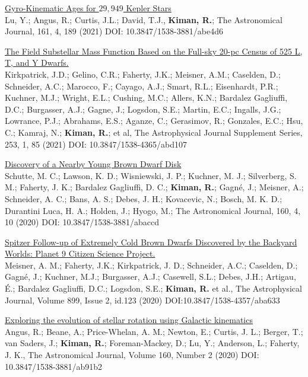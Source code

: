 \documentclass[10pt]{cv}
\begin{document}
\begin{llist}
\begin{etaremune}
  \item \href{https://ui.adsabs.harvard.edu/abs/2021arXiv210201772Y/abstract}{Gyro-Kinematic Ages for $29,949$ Kepler Stars}\\ Lu, Y.; Angus, R.; Curtis, J.L.; David, T.J., \textbf{​Kiman, R.}​; The Astronomical Journal, 161,  4, 189 (2021) DOI: 10.3847/1538-3881/abe4d6

  \item \href{https://ui.adsabs.harvard.edu/abs/2021ApJS..253....7K/abstract}{The Field Substellar Mass Function Based on the Full-sky 20-pc Census of 525 L, T, and Y Dwarfs.}\\ Kirkpatrick, J.D.; Gelino, C.R.; Faherty, J.K.; Meisner, A.M.; Caselden, D.; Schneider, A.C.; Marocco, F.; Cayago, A.J.; Smart, R.L.; Eisenhardt, P.R.; Kuchner, M.J.; Wright, E.L.; Cushing, M.C.; Allers, K.N.; Bardalez Gagliuffi, D.C.; Burgasser, A.J.; Gagne, J.; Logsdon, S.E.; Martin, E.C.; Ingalls, J.G.; Lowrance, P.J.; Abrahams, E.S.; Aganze, C.; Gerasimov, R.; Gonzales, E.C.; Hsu, C.; Kamraj, N.; \textbf{​Kiman, R.}​; et al, The Astrophysical Journal Supplement Series, 253, 1, 85 (2021) DOI: 10.3847/1538-4365/abd107

  \item \href{https://ui.adsabs.harvard.edu/abs/2020AJ....160..156S/abstract}{Discovery of a Nearby Young Brown Dwarf Disk}\\ Schutte, M. C.; Lawson, K. D.; Wisniewski, J. P.; Kuchner, M. J.; Silverberg, S. M.; Faherty, J. K.; Bardalez Gagliuffi, D. C.; \textbf{Kiman, R.}; Gagné, J.; Meisner, A.; Schneider, A. C.; Bans, A. S.; Debes, J. H.; Kovacevic, N.; Bosch, M. K. D.; Durantini Luca, H. A.; Holden, J.; Hyogo, M.; The Astronomical Journal, 160, 4, 10 (2020) DOI: 10.3847/1538-3881/abaccd 

  \item \href{https://ui.adsabs.harvard.edu/abs/2020ApJ...899..123M/abstract}{Spitzer Follow-up of Extremely Cold Brown Dwarfs Discovered by the Backyard Worlds: Planet 9 Citizen Science Project.}\\ Meisner, A. M.; Faherty, J.K.; Kirkpatrick, J. D.; Schneider, A.C.; Caselden, D.; Gagné, J.; Kuchner, M.J.; Burgasser, A.J.; Casewell, S.L.; Debes, J.H.; Artigau, É.; Bardalez Gagliuffi, D.C.; Logsdon, S.E.; \textbf{Kiman, R.} et al., The Astrophysical Journal, Volume 899, Issue 2, id.123 (2020) DOI:10.3847/1538-4357/aba633

  \item \href{https://ui.adsabs.harvard.edu/abs/2020AJ....160...90A/abstract}{Exploring the evolution of stellar rotation using Galactic kinematics}\\ Angus, R.; Beane, A.; Price-Whelan, A. M.; Newton, E.; Curtis, J. L.; Berger, T.; van Saders, J.; \textbf{Kiman, R.}; Foreman-Mackey, D.; Lu, Y.; Anderson, L.; Faherty, J. K., The Astronomical Journal, Volume 160, Number 2 (2020) DOI: 10.3847/1538-3881/ab91b2


\end{etaremune}
\end{llist}
\end{document}
